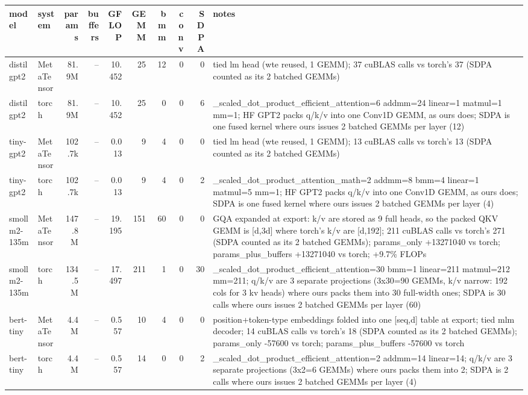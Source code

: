 \begin{tabular}{llrrrrrrrp{}}
\toprule
model & system & params & buffers & GFLOP & GEMM & bmm & conv & SDPA & notes \\
\midrule
distilgpt2 & MetaTensor & 81.9M & -- & 10.452 & 25 & 12 & 0 & 0 & tied lm head (wte reused, 1 GEMM); 37 cuBLAS calls vs torch's 37 (SDPA counted as its 2 batched GEMMs) \\
distilgpt2 & torch & 81.9M & -- & 10.452 & 25 & 0 & 0 & 6 & \_scaled\_dot\_product\_efficient\_attention=6 addmm=24 linear=1 matmul=1 mm=1; HF GPT2 packs q/k/v into one Conv1D GEMM, as ours does; SDPA is one fused kernel where ours issues 2 batched GEMMs per layer (12) \\
tiny-gpt2 & MetaTensor & 102.7k & -- & 0.013 & 9 & 4 & 0 & 0 & tied lm head (wte reused, 1 GEMM); 13 cuBLAS calls vs torch's 13 (SDPA counted as its 2 batched GEMMs) \\
tiny-gpt2 & torch & 102.7k & -- & 0.013 & 9 & 4 & 0 & 2 & \_scaled\_dot\_product\_attention\_math=2 addmm=8 bmm=4 linear=1 matmul=5 mm=1; HF GPT2 packs q/k/v into one Conv1D GEMM, as ours does; SDPA is one fused kernel where ours issues 2 batched GEMMs per layer (4) \\
smollm2-135m & MetaTensor & 147.8M & -- & 19.195 & 151 & 60 & 0 & 0 & GQA expanded at export: k/v are stored as 9 full heads, so the packed QKV GEMM is [d,3d] where torch's k/v are [d,192]; 211 cuBLAS calls vs torch's 271 (SDPA counted as its 2 batched GEMMs); params\_only +13271040 vs torch; params\_plus\_buffers +13271040 vs torch; +9.7\% FLOPs \\
smollm2-135m & torch & 134.5M & -- & 17.497 & 211 & 1 & 0 & 30 & \_scaled\_dot\_product\_efficient\_attention=30 bmm=1 linear=211 matmul=212 mm=211; q/k/v are 3 separate projections (3x30=90 GEMMs, k/v narrow: 192 cols for 3 kv heads) where ours packs them into 30 full-width ones; SDPA is 30 calls where ours issues 2 batched GEMMs per layer (60) \\
bert-tiny & MetaTensor & 4.4M & -- & 0.557 & 10 & 4 & 0 & 0 & position+token-type embeddings folded into one [seq,d] table at export; tied mlm decoder; 14 cuBLAS calls vs torch's 18 (SDPA counted as its 2 batched GEMMs); params\_only -57600 vs torch; params\_plus\_buffers -57600 vs torch \\
bert-tiny & torch & 4.4M & -- & 0.557 & 14 & 0 & 0 & 2 & \_scaled\_dot\_product\_efficient\_attention=2 addmm=14 linear=14; q/k/v are 3 separate projections (3x2=6 GEMMs) where ours packs them into 2; SDPA is 2 calls where ours issues 2 batched GEMMs per layer (4) \\

\end{tabular}
